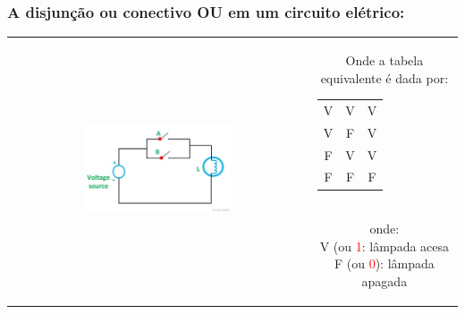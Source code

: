 \documentclass{beamer}
\begin{document}
\begin{frame}
\frametitle{A \textbf{disjunção} ou conectivo \textbf{OU}  em um circuito elétrico:}

\begin{tabular}{c||c}  
 
 \includegraphics[height=0.5\textheight,width=0.5\textwidth]{figuras/circuito_OR.jpg} 
 
  &
  \parbox{0.4\linewidth}{\vspace{-4cm} Onde a tabela equivalente é dada por:\\
  	\begin{tabular}{|c|c|c|}
	\hline
	$\mathbf{A}$ & $\mathbf{B}$ & $\mathbf{A \vee B}$ \\
	\hline
	V & V & V \\
	\hline
	V & F & V \\
	\hline
	F & V & V \\
	\hline
	F & F & F \\
	\hline
	\end{tabular}\\
  onde:\\
	V (ou  \textcolor{red}{1}: lâmpada acesa\\
	F (ou \textcolor{red}{0}): lâmpada apagada\\

  } %

\end{tabular} 	

\end{frame}
\end{document}
